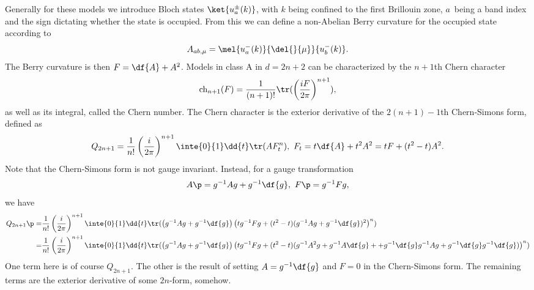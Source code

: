 Generally for these models we introduce Bloch states $\ket{u_{a}^{\pm}(k)}$, with $k$ being confined to the first Brillouin zone, $a$ being a band index and the sign dictating whether the state is occupied. From this we can define a non-Abelian Berry curvature for the occupied state according to
\begin{align*}
	A_{ab, \mu} = \mel{u_{a}^{-}(k)}{\del{}{\mu}}{u_{b}^{-}(k)}.
\end{align*}
The Berry curvature is then $F = \df{A} + A^{2}$. Models in class A in $d = 2n + 2$ can be characterized by the $n + 1$th Chern character
\begin{align*}
	\text{ch}_{n + 1}(F) = \frac{1}{(n + 1)!}\tr(\left(\frac{iF}{2\pi}\right)^{n + 1}),
\end{align*}
as well as its integral, called the Chern number. The Chern character is the exterior derivative of the $2(n + 1) - 1$th Chern-Simons form, defined as
\begin{align*}
	Q_{2n + 1} = \frac{1}{n!}\left(\frac{i}{2\pi}\right)^{n + 1}\inte{0}{1}\dd{t}\tr(AF_{t}^{n}),\ F_{t} = t\df{A} + t^{2}A^{2} = tF + (t^{2} - t)A^{2}.
\end{align*}
Note that the Chern-Simons form is not gauge invariant. Instead, for a gauge transformation
\begin{align*}
	A\p = g^{-1}Ag + g^{-1}\df{g},\ F\p = g^{-1}Fg,
\end{align*}
we have
\begin{align*}
	Q_{2n + 1}\p =& \frac{1}{n!}\left(\frac{i}{2\pi}\right)^{n + 1}\inte{0}{1}\dd{t}\tr(\left(g^{-1}Ag + g^{-1}\df{g}\right)\left(tg^{-1}Fg + (t^{2} - t)(g^{-1}Ag + g^{-1}\df{g})^{2}\right)^{n}) \\
	             =& \frac{1}{n!}\left(\frac{i}{2\pi}\right)^{n + 1}\inte{0}{1}\dd{t}\tr(\left(g^{-1}Ag + g^{-1}\df{g}\right)\left(tg^{-1}Fg + (t^{2} - t)(g^{-1}A^{2}g + g^{-1}A\df{g} +  + g^{-1}\df{g}g^{-1}Ag + g^{-1}\df{g}g^{-1}\df{g})\right)^{n})
\end{align*}
One term here is of course $Q_{2n + 1}$. The other is the result of setting $A = g^{-1}\df{g}$ and $F = 0$ in the Chern-Simons form. The remaining terms are the exterior derivative of some $2n$-form, somehow.

